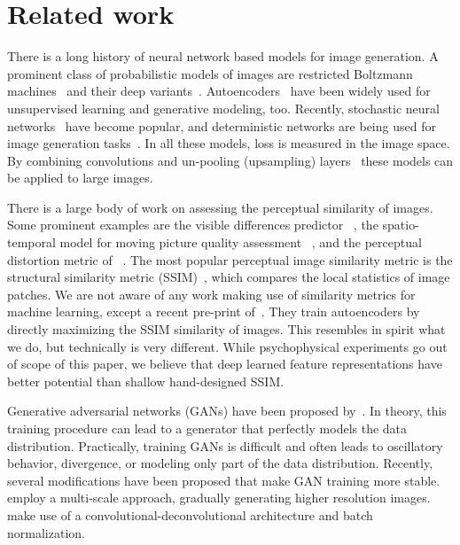 \documentclass{article}
\begin{document}
\section{Related work}
There is a long history of neural network based models for image generation.
A prominent class of probabilistic models of images are restricted Boltzmann machines~\citep{Hinton_1986, Smolensky_1986, Hinton_Science2006} and their deep variants~\citep{Hinton_NC2006,Salakhutdinov_2009,Lee_ICML2009}.
Autoencoders~\citep{Hinton_Science2006, Vincent_ICML2008} have been widely used for unsupervised learning and generative modeling, too.
Recently, stochastic neural networks~\citep{Bengio_ICML2014, Kingma_NIPS2014, Gregor_ICML2015} have become popular, and deterministic networks are being used for image generation tasks~\citep{Dosovitskiy_CVPR2015}.
In all these models, loss is measured in the image space.
By combining convolutions and un-pooling (upsampling) layers~\citep{Lee_ICML2009, Goodfellow_NIPS2014, Dosovitskiy_CVPR2015} these models can be applied to large images.

There is a large body of work on assessing the perceptual similarity of images.
Some prominent examples are the visible differences predictor ~\citep{Daly_1993}, the spatio-temporal model for moving picture quality assessment ~\citep{Lambrecht_1996}, and the perceptual distortion metric of ~\citet{Winkler_1998}.
The most popular perceptual image similarity metric is the structural similarity metric (SSIM)~\citep{Wang_2004}, which compares the local statistics of image patches.
We are not aware of any work making use of similarity metrics for machine learning, except a recent pre-print of~\citet{Ridgeway_arxiv15}.
They train autoencoders by directly maximizing the SSIM similarity of images.
This resembles in spirit what we do, but technically is very different. 
While psychophysical experiments go out of scope of this paper, we believe that deep learned feature representations have better potential than shallow hand-designed SSIM.

Generative adversarial networks (GANs) have been proposed by~\citet{Goodfellow_NIPS2014}.
In theory, this training procedure can lead to a generator that perfectly models the data distribution.
Practically, training GANs is difficult and often leads to oscillatory behavior, divergence, or modeling only part of the data distribution.
Recently, several modifications have been proposed that make GAN training more stable.
\citet{Denton_NIPS2015} employ a multi-scale approach, gradually generating higher resolution images.
\citet{Radford_arxiv2015} make use of a convolutional-deconvolutional architecture and batch normalization.
\end{document}
